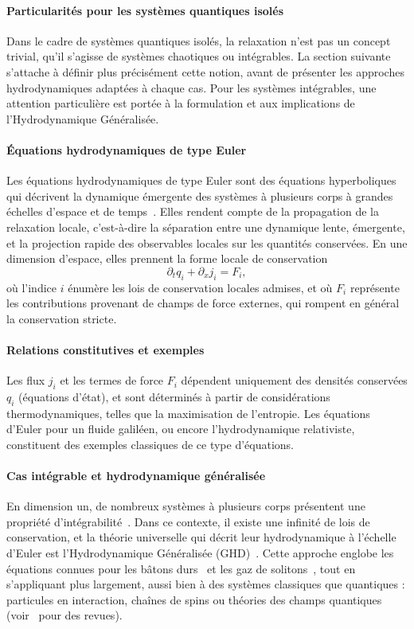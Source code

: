 \paragraph{Particularités pour les systèmes quantiques isolés}  
Dans le cadre de systèmes quantiques isolés, la relaxation n’est pas un concept trivial, qu’il s’agisse de systèmes chaotiques ou intégrables. La section suivante s’attache à définir plus précisément cette notion, avant de présenter les approches hydrodynamiques adaptées à chaque cas. Pour les systèmes intégrables, une attention particulière est portée à la formulation et aux implications de l’Hydrodynamique Généralisée.

\paragraph{Équations hydrodynamiques de type Euler}  
Les équations hydrodynamiques de type Euler sont des équations hyperboliques qui décrivent la dynamique émergente des systèmes à plusieurs corps à grandes échelles d’espace et de temps~\cite{ref1}. Elles rendent compte de la propagation de la relaxation locale, c’est-à-dire la séparation entre une dynamique lente, émergente, et la projection rapide des observables locales sur les quantités conservées. En une dimension d’espace, elles prennent la forme locale de conservation
\begin{equation}\label{chap:GHD:eq.conserv.1}
	\partial_t q_i + \partial_x j_i = F_i,	
\end{equation}
où l’indice $i$ énumère les lois de conservation locales admises, et où $F_i$ représente les contributions provenant de champs de force externes, qui rompent en général la conservation stricte.

\paragraph{Relations constitutives et exemples}  
Les flux $j_i$ et les termes de force $F_i$ dépendent uniquement des densités conservées $q_i$ (équations d’état), et sont déterminés à partir de considérations thermodynamiques, telles que la maximisation de l’entropie. Les équations d’Euler pour un fluide galiléen, ou encore l’hydrodynamique relativiste, constituent des exemples classiques de ce type d’équations.

\paragraph{Cas intégrable et hydrodynamique généralisée}  
En dimension un, de nombreux systèmes à plusieurs corps présentent une propriété d’intégrabilité~\cite{ref2,ref3}. Dans ce contexte, il existe une infinité de lois de conservation, et la théorie universelle qui décrit leur hydrodynamique à l’échelle d’Euler est l’Hydrodynamique Généralisée (GHD)~\cite{ref4,ref5}. Cette approche englobe les équations connues pour les bâtons durs~\cite{ref1,ref6} et les gaz de solitons~\cite{ref7,ref8,ref9}, tout en s’appliquant plus largement, aussi bien à des systèmes classiques que quantiques : particules en interaction, chaînes de spins ou théories des champs quantiques (voir~\cite{ref10} pour des revues).

